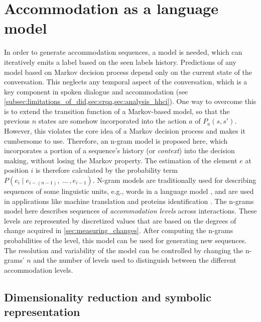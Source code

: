 \section{Accommodation as a language model} %
\label{sec:accommodation_as_a_lm}

In order to generate accommodation sequences, a model is needed, which can iteratively emits a label based on the seen labels history. 
Predictions of any model based on Markov decision process \citep{Bellman1957markovian} depend only on the current state of the conversation.
This neglects any temporal aspect of the conversation, which is a key component in spoken dialogue and accommodation (see \cref{subsec:limitations_of_did,sec:crqa,sec:analysis_hhci}).
One way to overcome this is to extend the transition function of a Markov-based model, so that the previous $n$ states are somehow incorporated into the action $a$ of $P_a(s, s')$.
However, this violates the core idea of a Markov decision process and makes it cumbersome to use.
Therefore, an n-gram model is proposed here, which incorporates a portion of a sequence's history (or \emph{context}) into the decision making, without losing the Markov property.
The estimation of the element $e$ at position $i$ is therefore calculated by the probability term $P(e_i \mid e_{i-(n-1)},\ \ldots\ , e_{i-1})$.
N-gram models are traditionally used for describing sequences of some linguistic units, e.g., words in a language model \citep[e.g.,][]{Niesler1996variable}, and are used in applications like machine translation \citep{Marino2006ngram} and proteins identification \citep{Xu2015identification}.
The n-grams model here describes sequences of \emph{accommodation levels} across interactions.
These levels are represented by discretized values that are based on the degrees of change acquired in \cref{sec:measuring_changes}.
After computing the n-grams probabilities of the level, this model can be used for generating new sequences.
The resolution and variability of the model can be controlled by changing the n-grams' $n$ and the number of levels used to distinguish between the different accommodation levels.

\subsection{Dimensionality reduction and symbolic representation}
\label{subsec:dim_reduction_and_symbolic_rep}

